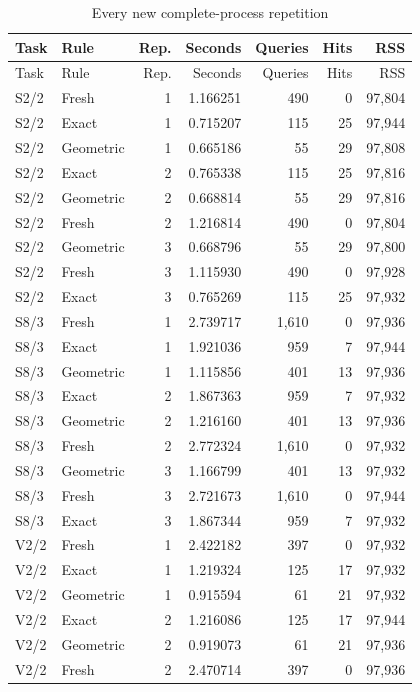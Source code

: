 \begingroup\small\setlength{\tabcolsep}{3pt}
\begin{longtable}{llrrrrr}
\caption{Every new complete-process repetition}\label{tab:repetition-ledger72}\\
\hline
Task & Rule & Rep. & Seconds & Queries & Hits & RSS \\
\hline\endfirsthead
\hline
Task & Rule & Rep. & Seconds & Queries & Hits & RSS \\
\hline\endhead
S2/2 & Fresh & 1 & 1.166251 & 490 & 0 & 97,804 \\
S2/2 & Exact & 1 & 0.715207 & 115 & 25 & 97,944 \\
S2/2 & Geometric & 1 & 0.665186 & 55 & 29 & 97,808 \\
S2/2 & Exact & 2 & 0.765338 & 115 & 25 & 97,816 \\
S2/2 & Geometric & 2 & 0.668814 & 55 & 29 & 97,816 \\
S2/2 & Fresh & 2 & 1.216814 & 490 & 0 & 97,804 \\
S2/2 & Geometric & 3 & 0.668796 & 55 & 29 & 97,800 \\
S2/2 & Fresh & 3 & 1.115930 & 490 & 0 & 97,928 \\
S2/2 & Exact & 3 & 0.765269 & 115 & 25 & 97,932 \\
S8/3 & Fresh & 1 & 2.739717 & 1,610 & 0 & 97,936 \\
S8/3 & Exact & 1 & 1.921036 & 959 & 7 & 97,944 \\
S8/3 & Geometric & 1 & 1.115856 & 401 & 13 & 97,936 \\
S8/3 & Exact & 2 & 1.867363 & 959 & 7 & 97,932 \\
S8/3 & Geometric & 2 & 1.216160 & 401 & 13 & 97,936 \\
S8/3 & Fresh & 2 & 2.772324 & 1,610 & 0 & 97,932 \\
S8/3 & Geometric & 3 & 1.166799 & 401 & 13 & 97,932 \\
S8/3 & Fresh & 3 & 2.721673 & 1,610 & 0 & 97,944 \\
S8/3 & Exact & 3 & 1.867344 & 959 & 7 & 97,932 \\
V2/2 & Fresh & 1 & 2.422182 & 397 & 0 & 97,932 \\
V2/2 & Exact & 1 & 1.219324 & 125 & 17 & 97,932 \\
V2/2 & Geometric & 1 & 0.915594 & 61 & 21 & 97,932 \\
V2/2 & Exact & 2 & 1.216086 & 125 & 17 & 97,944 \\
V2/2 & Geometric & 2 & 0.919073 & 61 & 21 & 97,936 \\
V2/2 & Fresh & 2 & 2.470714 & 397 & 0 & 97,936 \\

\end{longtable}
